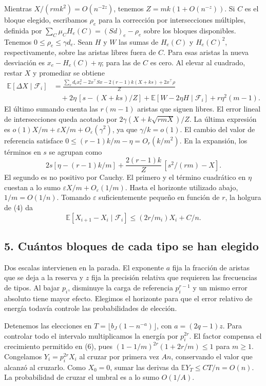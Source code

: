 \documentclass[spanish,11pt,a4paper]{article}
\begin{document}
Mientras \(X/(rmk^2)=O(n^{-2z})\), tenemos \(Z=mk(1+O(n^{-z}))\). Si \(C\) es el bloque elegido, escribamos \(\rho_e\) para la corrección por intersecciones múltiples, definida por \(\sum_C\mu_C H_e(C)=(Sd)_e-\rho_e\) sobre los bloques disponibles. Tenemos \(0\le\rho_e\le\gamma d_e\). Sean \(H\) y \(W\) las sumas de \(H_e(C)\) y \(H_e(C)^2\), respectivamente, sobre las aristas libres fuera de \(C\). Para esas aristas la nueva desviación es \(x_e-H_e(C)+\eta\); para las de \(C\) es cero. Al elevar al cuadrado, restar \(X\) y promediar se obtiene \[\begin{aligned}
 \mathbb E[\Delta X\mid\mathcal F_i]
 &=\frac{\sum_e d_e x_e^2-2x^\top Sx-2(r-1)k(X+ks)+2x^\top\rho}{Z}\\
 &\quad+2\eta\,[s-(X+ks)/Z]+\mathbb E[W-2\eta H\mid\mathcal F_i]
             +r\eta^2(m-1). 
\end{aligned}\tag{5}\] El último sumando cuenta las \(r(m-1)\) aristas que siguen libres. El error lineal de intersecciones queda acotado por \(2\gamma(X+k\sqrt{rmX})/Z\). La última expresión es \(o(1)X/m+\varepsilon X/m+O_\varepsilon(\gamma^2)\), ya que \(\gamma/k=o(1)\). El cambio del valor de referencia satisface \(0\le(r-1)k/m-\eta=O_r(k/m^2)\). En la expansión, los términos en \(s\) se agrupan como \[2s[\eta-(r-1)k/m]+\frac{2(r-1)k}{Z}\,[s^2/(rm)-X].\] El segundo es no positivo por Cauchy. El primero y el término cuadrático en \(\eta\) cuestan a lo sumo \(\varepsilon X/m+O_\varepsilon(1/m)\). Hasta el horizonte utilizado abajo, \(1/m=O(1/n)\). Tomando \(\varepsilon\) suficientemente pequeño en función de \(r\), la holgura de (4) da \[\mathbb E[X_{i+1}-X_i\mid\mathcal F_i]\le (2r/m_i)X_i+C/n . \tag{6}\]

\subsection{5. Cuántos bloques de cada tipo se han elegido}\label{cuuxe1ntos-bloques-de-cada-tipo-se-han-elegido}

Dos escalas intervienen en la parada. El exponente \(a\) fija la fracción de aristas que se deja a la reserva y \(z\) fija la precisión relativa que requieren las frecuencias de tipos. Al bajar \(p_i\), disminuye la carga de referencia \(p_i^{r-1}\) y un mismo error absoluto tiene mayor efecto. Elegimos el horizonte para que el error relativo de energía todavía controle las probabilidades de elección.

Detenemos las elecciones en \(T=\lfloor b_J(1-n^{-a})\rfloor\), con \(a=(2q-1)z\). Para controlar todo el intervalo multiplicamos la energía por \(p_i^{2r}\). El factor compensa el crecimiento permitido en (6), pues \((1-1/m)^{2r}(1+2r/m)\le1\) para \(m\ge1\). Congelamos \(Y_i=p_i^{2r}X_i\) al cruzar por primera vez \(An\), conservando el valor que alcanzó al cruzarlo. Como \(X_0=0\), sumar las derivas da \(\mathbb E Y_T\le CT/n=O(n)\). La probabilidad de cruzar el umbral es a lo sumo \(O(1/A)\).
\end{document}
